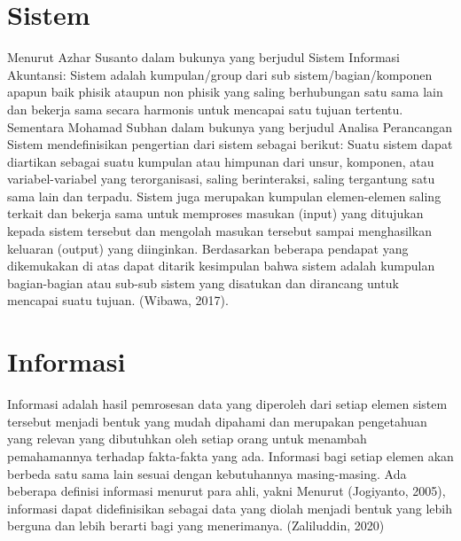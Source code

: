 \section{Sistem}
Menurut Azhar Susanto dalam bukunya yang berjudul Sistem Informasi Akuntansi: Sistem adalah kumpulan/group dari sub sistem/bagian/komponen apapun baik phisik ataupun non phisik yang saling berhubungan satu sama lain dan bekerja sama secara harmonis untuk mencapai satu tujuan tertentu. Sementara Mohamad Subhan dalam bukunya yang berjudul Analisa Perancangan Sistem mendefinisikan pengertian dari sistem sebagai berikut: Suatu sistem dapat diartikan sebagai suatu kumpulan atau himpunan dari unsur, komponen, atau variabel-variabel yang terorganisasi, saling berinteraksi, saling tergantung satu sama lain dan terpadu. Sistem juga merupakan kumpulan elemen-elemen saling terkait dan bekerja sama untuk memproses masukan (input) yang ditujukan kepada sistem tersebut dan mengolah masukan tersebut sampai menghasilkan keluaran (output) yang diinginkan. Berdasarkan beberapa pendapat yang dikemukakan di atas dapat ditarik kesimpulan bahwa sistem adalah kumpulan bagian-bagian atau sub-sub sistem yang disatukan dan dirancang untuk mencapai suatu tujuan. (Wibawa, 2017).

\section{Informasi}
Informasi adalah hasil pemrosesan data yang diperoleh dari setiap elemen sistem tersebut menjadi bentuk yang mudah dipahami dan merupakan pengetahuan yang relevan yang dibutuhkan oleh setiap orang untuk menambah pemahamannya terhadap fakta-fakta yang ada. Informasi bagi setiap elemen akan berbeda satu sama lain sesuai dengan kebutuhannya masing-masing. Ada beberapa definisi informasi menurut para ahli, yakni Menurut (Jogiyanto, 2005), informasi dapat didefinisikan   sebagai data yang diolah menjadi bentuk  yang lebih  berguna  dan  lebih  berarti  bagi yang menerimanya. (Zaliluddin, 2020)
